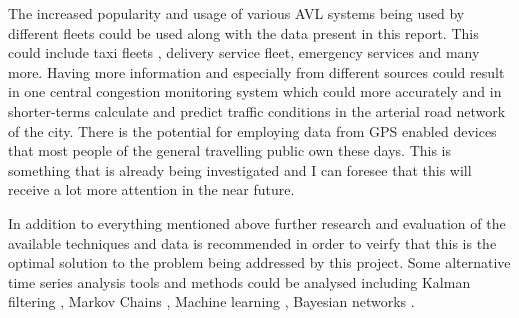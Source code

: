 The increased popularity and usage of various AVL systems being used by different fleets could be used along with the data present in this report. This could include taxi fleets \cite{rahmani2010requirements}, delivery service fleet, emergency services and many more. Having more information and especially from different sources could result in one central congestion monitoring system which could more accurately and in shorter-terms calculate and predict traffic conditions in the arterial road network of the city. There is the potential for employing data from GPS enabled devices that most people of the general travelling public own these days. This is something that is already being investigated \cite{thiagarajan2010cooperative} and I can foresee that this will receive a lot more attention in the near future.

In addition to everything mentioned above further research and evaluation of the available techniques and data is recommended in order to veirfy that this is the optimal solution to the problem being addressed by this project. Some alternative time series analysis tools and methods could be analysed including Kalman filtering \cite{kalmanFiltering} \cite{Guo201450}, Markov Chains \cite{Qi201495} \cite{Ramezani20121576}, Machine learning \cite{herring2010real}, Bayesian networks \cite{Wang201479}.




